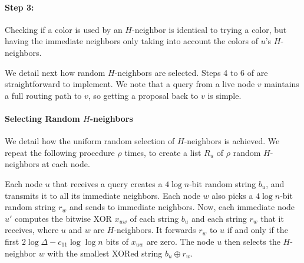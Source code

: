 \paragraph{Step 3:}Checking if a color is used by an $H$-neighbor is identical to trying a color, but having the immediate neighbors only taking into account the colors of $u$'s $H$-neighbors.



We detail next how random $H$-neighbors are selected.
Steps 4 to 6 of  are straightforward to implement. We note that a query from a live node $v$ maintains a full routing path to $v$, so getting a proposal back to $v$ is simple.

\paragraph{Selecting Random $H$-neighbors}

We detail how the uniform random selection of $H$-neighbors is achieved.
We repeat the following procedure $\rho$ times, to create a list $R_u$ of $\rho$ random $H$-neighbors at each node.

Each node $u$ that receives a query creates a $4\log n$-bit random string $b_u$, and transmits it to all its immediate neighbors. Each node $w$ also picks a $4\log n$-bit random string $r_w$ and sends to immediate neighbors. Now, each immediate node $u'$ computes the bitwise XOR $x_{uw}$ of each string $b_u$ and each string $r_w$ that it receives, where $u$ and $w$ are $H$-neighbors. It forwards $r_w$ to $u$ if and only if the first $2\log \Delta - c_{11} \log\log n$ bits of $x_{uw}$ are zero. 
The node $u$ then selects the $H$-neighbor $w$ with the smallest XORed string $b_u \oplus r_w$. 


